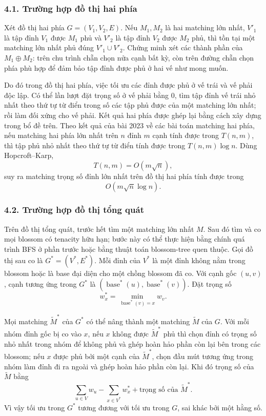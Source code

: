 \documentclass[11pt]{article}
\begin{document}
\subsubsection*{4.1. Trường hợp đồ thị hai phía}

Xét đồ thị hai phía \(G=(V_1,V_2,E)\). Nếu \(M_1,M_2\) là hai matching lớn
nhất, \(V'_1\) là tập đỉnh \(V_1\) được \(M_1\) phủ và \(V'_2\) là tập đỉnh
\(V_2\) được \(M_2\) phủ, thì tồn tại một matching lớn nhất phủ đúng
\(V'_1\cup V'_2\). Chứng minh xét các thành phần của \(M_1\oplus M_2\): trên
chu trình chẵn chọn nửa cạnh bất kỳ, còn trên đường chẵn chọn phía phù hợp để
đảm bảo tập đỉnh được phủ ở hai vế như mong muốn.

Do đó trong đồ thị hai phía, việc tối ưu các đỉnh được phủ ở vế trái và vế
phải độc lập. Có thể lần lượt đặt trọng số ở vế phải bằng \(0\), tìm tập đỉnh
vế trái nhỏ nhất theo thứ tự từ điển trong số các tập phủ được của một matching
lớn nhất; rồi làm đối xứng cho vế phải. Kết quả hai phía được ghép lại bằng
cách xây dựng trong bổ đề trên. Theo kết quả của bài 2023 về các bài toán
matching hai phía, nếu matching hai phía lớn nhất trên \(n\) đỉnh \(m\) cạnh
tính được trong \(T(n,m)\), thì tập phủ nhỏ nhất theo thứ tự từ điển tính được
trong \(T(n,m)\log n\). Dùng Hopcroft--Karp,
\[
  T(n,m)=O(m\sqrt n),
\]
suy ra matching trọng số đỉnh lớn nhất trên đồ thị hai phía tính được trong
\[
  O(m\sqrt n\log n).
\]

\subsubsection*{4.2. Trường hợp đồ thị tổng quát}

Trên đồ thị tổng quát, trước hết tìm một matching lớn nhất \(M\). Sau đó tìm
và co mọi blossom có tenacity hữu hạn; bước này có thể thực hiện bằng chính
quá trình BFS ở phần trước hoặc bằng thuật toán blossom-tree quen thuộc. Gọi
đồ thị sau co là \(G^*=(V^*,E^*)\). Mỗi đỉnh của \(V^*\) là một đỉnh không nằm
trong blossom hoặc là base đại diện cho một chồng blossom đã co. Với cạnh gốc
\((u,v)\), cạnh tương ứng trong \(G^*\) là
\((\operatorname{base}^*(u),\operatorname{base}^*(v))\). Đặt trọng số
\[
  w^*_x=\min_{\operatorname{base}^*(v)=x} w_v.
\]

Mọi matching \(\widetilde M^*\) của \(G^*\) có thể nâng thành một matching
\(\widetilde M\) của \(G\). Với mỗi nhóm đỉnh gốc bị co vào \(x\), nếu \(x\)
không được \(\widetilde M^*\) phủ thì chọn đỉnh có trọng số nhỏ nhất trong
nhóm để không phủ và ghép hoàn hảo phần còn lại bên trong các blossom; nếu
\(x\) được phủ bởi một cạnh của \(\widetilde M^*\), chọn đầu mút tương ứng
trong nhóm làm đỉnh đi ra ngoài và ghép hoàn hảo phần còn lại. Khi đó trọng
số của \(\widetilde M\) bằng
\[
  \sum_{u\in V} w_u-\sum_{x\in V^*} w^*_x
  + \text{trọng số của } \widetilde M^*.
\]
Vì vậy tối ưu trong \(G^*\) tương đương với tối ưu trong \(G\), sai khác bởi
một hằng số.
\end{document}
